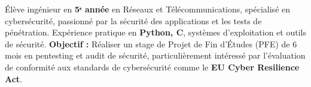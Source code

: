 
\begin{cvparagraph}

  Élève ingénieur en \textbf{5ᵉ année} en Réseaux et Télécommunications, spécialisé en cybersécurité, passionné par la sécurité des applications et les tests de pénétration. Expérience pratique en \textbf{Python, C}, systèmes d'exploitation et outils de sécurité.
  \newline
  \textbf{Objectif :} Réaliser un stage de Projet de Fin d'Études (PFE) de 6 mois en pentesting et audit de sécurité, particulièrement intéressé par l'évaluation de conformité aux standards de cybersécurité comme le \textbf{EU Cyber Resilience Act}.

\end{cvparagraph}